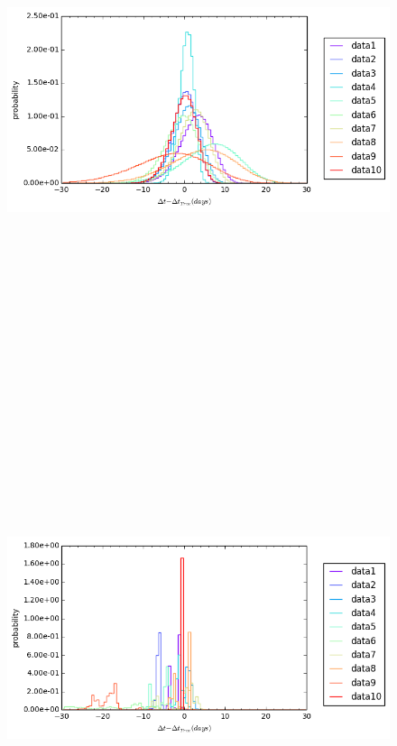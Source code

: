\documentclass[\docopts]{\docclass}
\begin{document}
\begin{figure}[!h]
\includegraphics[width=\textwidth, height=15cm, keepaspectratio]{summary_prior_summary.png}
\caption{}
\label{fig:summary_prior}
\end{figure}

\begin{figure}[!h]
\includegraphics[width=\textwidth, height=15cm, keepaspectratio]{summary_posterior_summary_newWhiten.png}
\caption{}
\label{fig:summary_post_newWhiten}
\end{figure}
\end{document}
